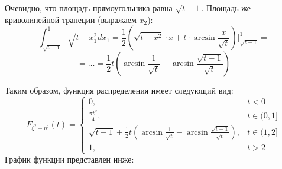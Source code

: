 \begin{enumerate}
\begin{enumerate}
		 Очевидно, что площадь прямоугольника равна $\sqrt{t-1}$. Площадь же криволинейной трапеции (выражаем $x_2$):
		 \[ \int_{\sqrt{t-1}}^{1} \sqrt{t-x_1^2} dx_1 = \frac{1}{2} \left( \sqrt{t-x^2} \cdot x + t \cdot \arcsin \frac{x}{\sqrt{t}} \right) \bigg|_{\sqrt{t-1}}^{1} = \]
		 \[ = \dots = \frac{1}{2} t \left( \arcsin \frac{1}{\sqrt{t}} - \arcsin \frac{\sqrt{t-1}}{\sqrt{t}} \right) \]
	\end{enumerate}
	\begin{figure}[H]
	\end{figure}
	Таким образом, функция распределения имеет следующий вид:
	\[
	F_{\xi^2 + \eta^2} (t) =
		\begin{cases}
		0, &t < 0 \\
		\frac{\pi t^2}{4}, &t \in (0, 1] \\
		\sqrt{t-1} + \frac{1}{2} t \left( \arcsin \frac{1}{\sqrt{t}} - \arcsin \frac{\sqrt{t-1}}{\sqrt{t}} \right), &t \in (1, 2] \\
		1, &t > 2
	\end{cases}
	\]
	График функции представлен ниже:
	\begin{figure}[H]
	\end{figure}


\end{enumerate}
